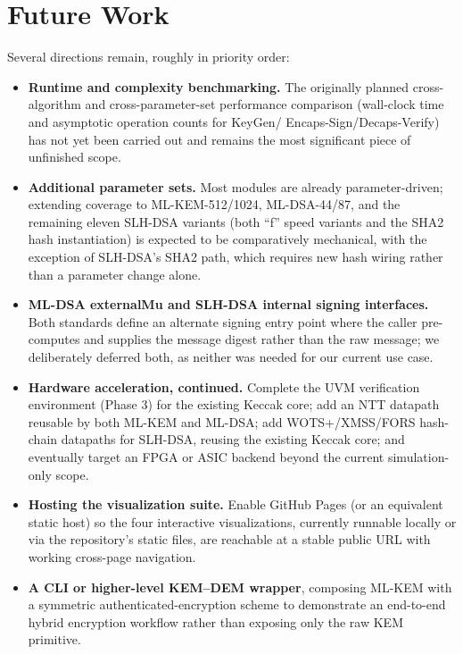 \documentclass[10pt,conference]{IEEEtran}
\begin{document}
\section{Future Work}

Several directions remain, roughly in priority order:

\begin{itemize}
\item \textbf{Runtime and complexity benchmarking.} The originally
  planned cross-algorithm and cross-parameter-set performance comparison
  (wall-clock time and asymptotic operation counts for KeyGen/
  Encaps-Sign/Decaps-Verify) has not yet been carried out and remains
  the most significant piece of unfinished scope.
\item \textbf{Additional parameter sets.} Most modules are already
  parameter-driven; extending coverage to ML-KEM-512/1024, ML-DSA-44/87,
  and the remaining eleven SLH-DSA variants (both ``f'' speed variants
  and the SHA2 hash instantiation) is expected to be comparatively
  mechanical, with the exception of SLH-DSA's SHA2 path, which requires
  new hash wiring rather than a parameter change alone.
\item \textbf{ML-DSA externalMu and SLH-DSA internal signing
  interfaces.} Both standards define an alternate signing entry point
  where the caller pre-computes and supplies the message digest rather
  than the raw message; we deliberately deferred both, as neither was
  needed for our current use case.
\item \textbf{Hardware acceleration, continued.} Complete the UVM
  verification environment (Phase 3) for the existing Keccak core; add
  an NTT datapath reusable by both ML-KEM and ML-DSA; add WOTS+/XMSS/FORS
  hash-chain datapaths for SLH-DSA, reusing the existing Keccak core;
  and eventually target an FPGA or ASIC backend beyond the current
  simulation-only scope.
\item \textbf{Hosting the visualization suite.} Enable GitHub Pages (or
  an equivalent static host) so the four interactive visualizations,
  currently runnable locally or via the repository's static files, are
  reachable at a stable public URL with working cross-page navigation.
\item \textbf{A CLI or higher-level KEM--DEM wrapper}, composing
  ML-KEM with a symmetric authenticated-encryption scheme to demonstrate
  an end-to-end hybrid encryption workflow rather than exposing only the
  raw KEM primitive.
\end{itemize}
\end{document}
